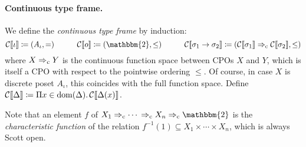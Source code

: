 \paragraph{Continuous type frame.}
We define the \emph{continuous type frame} by induction:
\[
   \cmng{\iota} \coloneqq (A_\iota, =)
   \qquad\quad \cmng{\boolsort} \coloneqq (\mathbbm{2}, \leq)
   \qquad\quad \cmng{\sigma_1 \to \sigma_2} \coloneqq (\cmng{\sigma_1} \cTo \cmng{\sigma_2}, \leq)
\]
where $X \Rightarrow_{\rm c} Y$ is the continuous function space between CPOs $X$ and $Y$, which is itself a CPO with respect to the pointwise ordering $\leq$.
Of course, in case $X$ is discrete poset $A_\iota$, this coincides with the full function space.
Define $\mathcal{C}\llbracket \Delta \rrbracket \coloneqq \Pi x \in \mathrm{dom}(\Delta).\,\mathcal{C}\llbracket \Delta(x) \rrbracket$.

Note that an element $f$ of $X_1 \cTo \cdots{} \cTo X_n \cTo \mathbbm{2}$ is the \emph{characteristic function} of the relation $f^{-1}(1) \subseteq X_1 \times \cdots \times X_n$, which is always Scott open.


